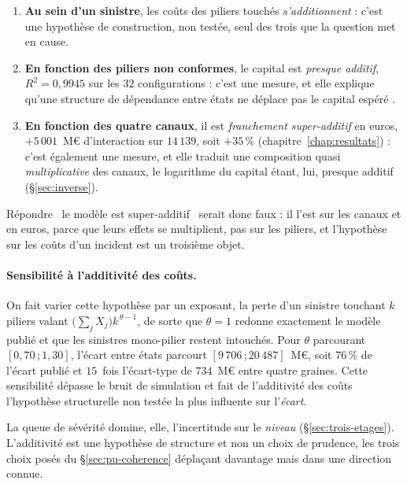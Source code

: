 \begin{enumerate}[leftmargin=*,itemsep=2pt]
\item \textbf{Au sein d'un sinistre}, les coûts des piliers touchés \emph{s'additionnent} : c'est
une hypothèse de construction, non testée, seul des trois que la question met en cause.
\item \textbf{En fonction des piliers non conformes}, le capital est \emph{presque additif},
$R^2=0{,}9945$ sur les $32$ configurations : c'est une mesure, et elle explique qu'une structure de
dépendance entre états ne déplace pas le capital espéré \matcomp.
\item \textbf{En fonction des quatre canaux}, il est \emph{franchement super-additif} en euros,
$+5\,001$~M\euro{} d'interaction sur $14\,139$, soit $+35\,\%$ (chapitre~\ref{chap:resultats}) :
c'est également une mesure, et elle traduit une composition quasi \emph{multiplicative} des
canaux, le logarithme du capital étant, lui, presque additif (\S\ref{sec:inverse}).
\end{enumerate}

\noindent Répondre \og~le modèle est super-additif~\fg{} serait donc faux : il l'est sur les canaux
et en euros, parce que leurs effets se multiplient, pas sur les piliers, et l'hypothèse sur les
coûts d'un incident est un troisième objet.

\paragraph{Sensibilité à l'additivité des coûts.} On fait varier cette hypothèse par un exposant, la
perte d'un sinistre touchant $k$ piliers valant $\bigl(\sum_j X_j\bigr)k^{\,\theta-1}$, de sorte que
$\theta=1$ redonne exactement le modèle publié et que les sinistres mono-pilier restent intouchés.
Pour $\theta$ parcourant $[0{,}70\,;1{,}30]$, l'écart entre états parcourt
$[9\,706\,;20\,487]$~M\euro, soit $76\,\%$ de l'écart publié et $15$~fois l'écart-type de
$734$~M\euro{} entre quatre graines. Cette sensibilité dépasse le bruit de simulation et fait de l'additivité des coûts
l'hypothèse structurelle non testée la plus influente sur l'\emph{écart}.

La queue de sévérité domine,
elle, l'incertitude sur le \emph{niveau} (\S\ref{sec:trois-etages}). L'additivité est une hypothèse de structure et non un choix
de prudence, les trois choix posés du \S\ref{sec:pu-coherence} déplaçant davantage mais dans une
direction connue.

